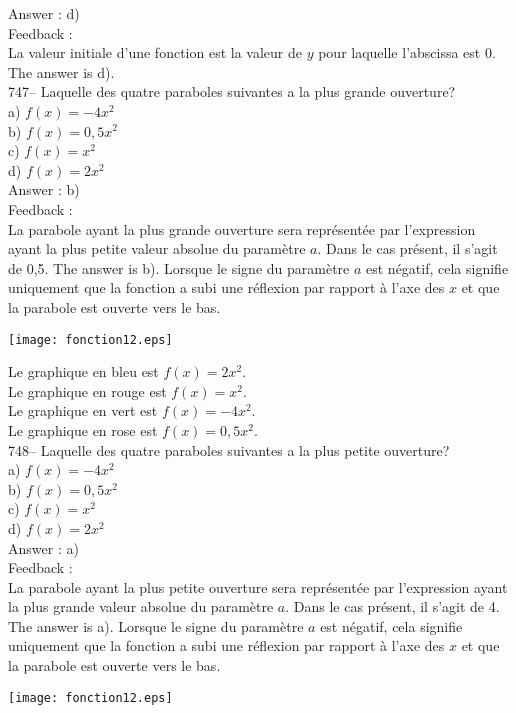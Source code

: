 ﻿\documentclass[letterpaper, 12pt]{article}
\begin{document}
Answer : d)\\

Feedback : \\
La valeur initiale d'une fonction est la valeur de $y$ pour laquelle
l'abscissa est 0.  The answer is d).\\

747-- Laquelle des quatre paraboles suivantes a la plus grande ouverture?\\
a) $f(x)=-4x^{2}$\\
b) $f(x)=0,5x^{2}$\\
c) $f(x)=x^{2}$\\
d) $f(x)=2x^{2}$\\

Answer : b)\\

Feedback : \\
La parabole ayant la plus grande ouverture sera repr\'esent\'ee par
l'expression ayant la plus petite valeur absolue du param\`etre $a$. Dans le
cas pr\'esent, il s'agit de 0,5. The answer is b). Lorsque le signe
du param\`etre $a$ est n\'egatif, cela signifie uniquement que la fonction a
subi une r\'eflexion par rapport \`a l'axe des $x$ et que la parabole est
ouverte vers le bas.\\
    \begin{center}
    \texttt{[image: fonction12.eps]}
    \end{center}
Le graphique en bleu est $f(x)=2x^{2}$.\\
Le graphique en rouge est $f(x)=x^{2}$.\\
Le graphique en vert est $f(x)=-4x^{2}$.\\
Le graphique en rose est $f(x)=0,5x^{2}$.\\


748-- Laquelle des quatre paraboles suivantes a la plus petite ouverture?\\
a) $f(x)=-4x^{2}$\\
b) $f(x)=0,5x^{2}$\\
c) $f(x)=x^{2}$\\
d) $f(x)=2x^{2}$\\

Answer : a)\\

Feedback : \\
La parabole ayant la plus petite ouverture sera repr\'esent\'ee par
l'expression ayant la plus grande valeur absolue du param\`etre $a$. Dans le
cas pr\'esent, il s'agit de 4. The answer is a). Lorsque le signe du
param\`etre $a$ est n\'egatif, cela signifie uniquement que la fonction a
subi une r\'eflexion par rapport \`a l'axe des $x$ et que la parabole est
ouverte vers le bas.\\
    \begin{center}
    \texttt{[image: fonction12.eps]}
    \end{center}
\end{document}
